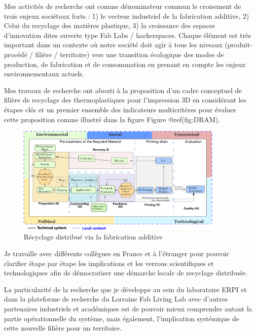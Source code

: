 \documentclass[
  11pt,
]{article}
\begin{document}
Mes activités de recherche ont comme dénominateur commun le croisement
de trois enjeux sociétaux forts : 1) le vecteur industriel de la
fabrication additive, 2) Celui du recyclage des matières plastique, 3)
la croissance des espaces d'innovation dites ouverte type Fab Labs /
hackerspaces. Chaque élément est très important dans un contexte où
notre société doit agir à tous les niveaux (produit-procédé / filière /
territoire) vers une transition écologique des modes de production, de
fabrication et de consommation en prenant en compte les enjeux
environnementaux actuels.

Mes travaux de recherche ont abouti à la proposition d'un cadre
conceptuel de filière de recyclage des thermoplastiques pour
l'impression 3D en considérant les étapes clés et un premier ensemble
des indicateurs multicritères pour évaluer cette proposition comme
illustré dans la figure Figure @ref(fig:DRAM).

\begin{figure}[H]

{\centering \includegraphics[width=0.9\textwidth,height=\textheight]{Figures/SDRAM-00.pdf}

}

\caption{Récyclage distribué via la fabrication additive}

\end{figure}

Je travaille avec différents collègues en France et à l'étranger pour
pouvoir clarifier étape par étape les implications et les verrous
scientifiques et technologiques afin de démocratiser une démarche locale
de recyclage distribuée.

La particularité de la recherche que je développe au sein du laboratoire
ERPI et dans la plateforme de recherche du Lorraine Fab Living Lab avec
d'autres partenaires industriels et académiques est de pouvoir mieux
comprendre autant la partie opérationnelle du système, mais également,
l'implication systémique de cette nouvelle filière pour un territoire.
\end{document}
